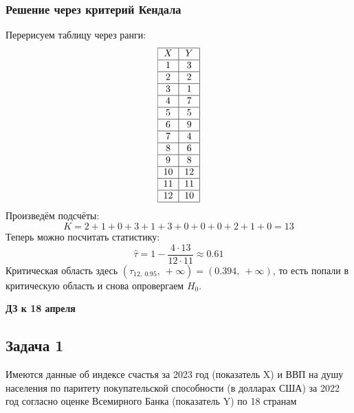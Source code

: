 \documentclass[12pt, a4paper]{article}
\newcommand{\oo}{\infty}
\begin{document}
\subsubsection*{Решение через критерий Кендала}
Перерисуем таблицу через ранги:
\[\begin{tabular}{|c|c|}
    \hline
    $X$ & $Y$\\
    \hline
    1 & 3\\
    \hline
    2 & 2\\
    \hline
    3 & 1\\
    \hline
    4 & 7\\
    \hline
    5 & 5\\
    \hline
    6 & 9\\
    \hline
    7 & 4\\
    \hline
    8 & 6\\
    \hline
    9 & 8\\
    \hline
    10 & 12\\
    \hline
    11 & 11\\
    \hline
    12 & 10\\
    \hline
\end{tabular}\]
Произведём подсчёты:
\[K = 2 + 1 + 0 + 3 + 1 + 3 + 0 + 0 + 0 + 2 + 1 + 0 = 13\]
Теперь можно посчитать статистику:
\[\hat \tau = 1 - \frac{4 \cdot 13}{12\cdot 11} \approx 0.61\]
Критическая область здесь $(\tau_{12,\ 0.95},\ +\oo) = (0.394,\ +\oo)$, то есть попали в критическую область и снова опровергаем $H_0$.

\begin{center}
    \bf ДЗ к 18 апреля
\end{center}
\subsection*{Задача 1}
Имеются данные об индексе счастья за 2023 год (показатель X)  и ВВП на душу населения по паритету покупательской способности (в  долларах США) за 2022 год согласно оценке Всемирного Банка (показатель Y) по 18 странам
\end{document}
